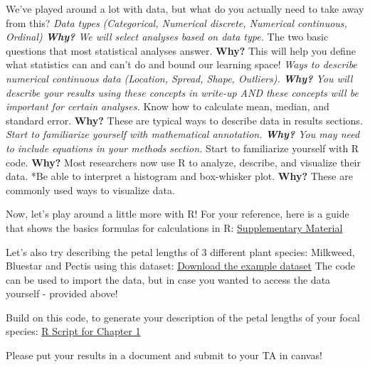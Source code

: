 \documentclass[
]{book}
\begin{document}
We've played around a lot with data, but what do you actually need to take away from this?
\emph{Data types (Categorical, Numerical discrete, Numerical continuous, Ordinal)
\textbf{Why?} We will select analyses based on data type.
}The two basic questions that most statistical analyses answer.
\textbf{Why?} This will help you define what statistics can and can't do and bound our learning space!
\emph{Ways to describe numerical continuous data (Location, Spread, Shape, Outliers).
\textbf{Why?} You will describe your results using these concepts in write-up AND these concepts will be important for certain analyses.
}Know how to calculate mean, median, and standard error.
\textbf{Why?} These are typical ways to describe data in results sections.
\emph{Start to familiarize yourself with mathematical annotation.
\textbf{Why?} You may need to include equations in your methods section.
}Start to familiarize yourself with R code.
\textbf{Why?} Most researchers now use R to analyze, describe, and visualize their data.
*Be able to interpret a histogram and box-whisker plot.
\textbf{Why?} These are commonly used ways to visualize data.

Now, let's play around a little more with R! For your reference, here is a guide that shows the basics formulas for calculations in R: \href{downloads/calculator.pdf}{Supplementary Material}

Let's also try describing the petal lengths of 3 different plant species: Milkweed, Bluestar and Pectis using this dataset:
\href{downloads/lesson2data.csv}{Download the example dataset}
The code can be used to import the data, but in case you wanted to access the data yourself - provided above!

Build on this code, to generate your description of the petal lengths of your focal species:
\href{downloads/lesson2summarystatistics.R}{R Script for Chapter 1}

Please put your results in a document and submit to your TA in canvas!

  
\end{document}
